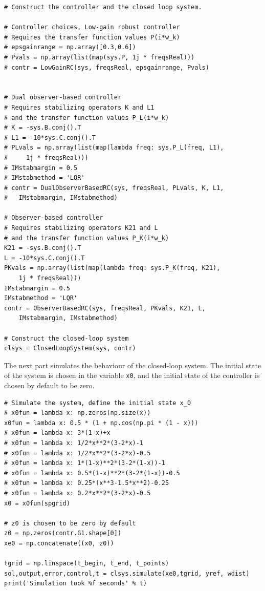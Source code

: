 \documentclass[11pt, a4paper]{amsart}
\theoremstyle{definition}
\numberwithin{equation}{section}
\begin{document}
\begin{lstlisting} 
# Construct the controller and the closed loop system.

# Controller choices, Low-gain robust controller
# Requires the transfer function values P(i*w_k)
# epsgainrange = np.array([0.3,0.6])
# Pvals = np.array(list(map(sys.P, 1j * freqsReal)))
# contr = LowGainRC(sys, freqsReal, epsgainrange, Pvals)


# Dual observer-based controller
# Requires stabilizing operators K and L1
# and the transfer function values P_L(i*w_k)
# K = -sys.B.conj().T
# L1 = -10*sys.C.conj().T
# PLvals = np.array(list(map(lambda freq: sys.P_L(freq, L1),
#     1j * freqsReal)))
# IMstabmargin = 0.5
# IMstabmethod = 'LQR'
# contr = DualObserverBasedRC(sys, freqsReal, PLvals, K, L1, 
#	IMstabmargin, IMstabmethod)

# Observer-based controller
# Requires stabilizing operators K21 and L
# and the transfer function values P_K(i*w_k)
K21 = -sys.B.conj().T
L = -10*sys.C.conj().T
PKvals = np.array(list(map(lambda freq: sys.P_K(freq, K21), 
    1j * freqsReal)))
IMstabmargin = 0.5
IMstabmethod = 'LQR'
contr = ObserverBasedRC(sys, freqsReal, PKvals, K21, L,
	IMstabmargin, IMstabmethod)

# Construct the closed-loop system 
clsys = ClosedLoopSystem(sys, contr) 
\end{lstlisting}

The next part simulates the behaviour of the closed-loop system. The initial state of the system is chosen in the variable \texttt{x0}, and the initial state of the controller is chosen by default to be zero.

\begin{lstlisting}
# Simulate the system, define the initial state x_0
# x0fun = lambda x: np.zeros(np.size(x))
x0fun = lambda x: 0.5 * (1 + np.cos(np.pi * (1 - x)))
# x0fun = lambda x: 3*(1-x)+x
# x0fun = lambda x: 1/2*x**2*(3-2*x)-1
# x0fun = lambda x: 1/2*x**2*(3-2*x)-0.5
# x0fun = lambda x: 1*(1-x)**2*(3-2*(1-x))-1
# x0fun = lambda x: 0.5*(1-x)**2*(3-2*(1-x))-0.5
# x0fun = lambda x: 0.25*(x**3-1.5*x**2)-0.25
# x0fun = lambda x: 0.2*x**2*(3-2*x)-0.5
x0 = x0fun(spgrid)

# z0 is chosen to be zero by default
z0 = np.zeros(contr.G1.shape[0])
xe0 = np.concatenate((x0, z0))

tgrid = np.linspace(t_begin, t_end, t_points)
sol,output,error,control,t = clsys.simulate(xe0,tgrid, yref, wdist)
print('Simulation took %f seconds' % t)
\end{lstlisting}
\end{document}
